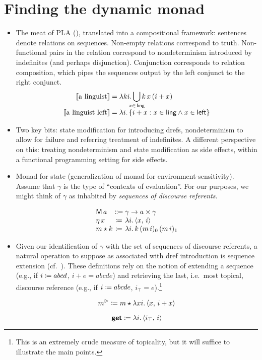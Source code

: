 \section{Finding the dynamic monad}
\begin{itemize}
	\item The meat of PLA (\citealt{Dekker:1994}), translated into a compositional framework: sentences denote relations on sequences. Non-empty relations correspond to truth. Non-functional pairs in the relation correspond to nondeterminism introduced by indefinites (and perhaps disjunction). Conjunction corresponds to relation composition, which pipes the sequences output by the left conjunct to the right conjunct.%
	\[\begin{array}{r@{}l}
		\sv{\text{a linguist}} &{}= \lambda ki.\displaystyle\bigcup_{\mathclap{x\in\,\textsf{ling}}}k\,x\,(i + x)%
		\\
		\sv{\text{a linguist left}} &{}= \lambda i.\,\{i + x : x \in \textsf{ling} \wedge x \in \textsf{left}\}%
	\end{array}\]%

	\item Two key bits: state modification for introducing drefs, nondeterminism to allow for failure and referring treatment of indefinites. A different perspective on this: treating nondeterminism and state modification as side effects, within a functional programming setting for side effects. %
	
	\item Monad for state (generalization of monad for environment-sensitivity). Assume that $\gamma$ is the type of ``contexts of evaluation''. For our purposes, we might think of $\gamma$ as inhabited by \emph{sequences of discourse referents}.%
	\begin{defi}\label{state}
		\[\begin{array}[t]
			{@{}l@{}c@{}l@{}}
			\textsf{M}\,a &{}\Coloneqq{} &\gamma \ra a \times \gamma	%
			\\
			\eta\,x &{}\ceq{} &\lambda i.\,\ab{x,\,i}
			\\
			m \star k &{}\ceq{} &\lambda i.\,k\,(m\,i)_0\,(m\,i)_1%
		\end{array}\]
	\end{defi}
	
	\item Given our identification of $\gamma$ with the set of sequences of discourse referents, a natural operation to suppose as associated with dref introduction is sequence extension (cf.~\citealt{Groote:2006, Unger:2012, Charlow:diss}). These definitions rely on the notion of extending a sequence (e.g., if $i \coloneqq abcd$, $i+e = abcde$) and retrieving the last, i.e.~most topical, discourse reference (e.g., if $i \coloneqq abcde$, $i_\top = e$).\footnote{This is an extremely crude measure of topicality, but it will suffice to illustrate the main points.}%
	\begin{defi}
		\[m^\rhd \coloneqq m \star \lambda xi.\,\langle x,\,i + x \rangle\]
	\end{defi}
	\begin{defi}
		\[\textbf{\textsf{get}} \coloneqq \lambda i.\,\langle i_\top,\,i \rangle\]
	\end{defi}
	

\end{itemize}
